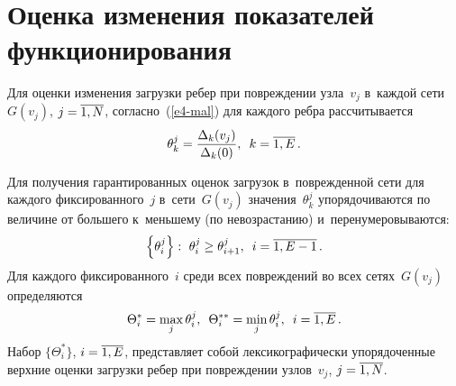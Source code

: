 \begin{multicols}{2}
\begin{figure*}[b] %
\vspace*{1pt}
  \begin{center}
 \mbox{%
 \epsfxsize=153.408mm 
 }
\end{center}
\vspace*{-9pt}
\end{figure*}


\section{Оценка изменения показателей функционирования }

Для оценки изменения загрузки ребер при по\-вреж\-де\-нии узла~$v_j$ в~каждой сети~$G(v_j)$, $j \hm= \overline{1, N}$, 
согласно~(\ref{e4-mal}) для каждого ребра рассчитывается
$$
\theta_k^j = \displaystyle\frac{\displaystyle \Delta_k(v_j)\mathstrut}{\displaystyle \Delta_k(0)\mathstrut}, \enskip k = \overline{1, E}\,.
$$

Для получения гарантированных оценок загрузок в~по\-вреж\-ден\-ной сети для каждого 
фиксированного~$j$ в~сети~$G(v_j)$ значения~$\theta_k^j$ упорядочиваются по 
величине от большего к~меньшему (по не\-воз\-рас\-та\-нию) и~перенумеровываются:
$$
\left\{\theta_i^j\right\}: \ \theta_{i}^j \ge \theta_{i+1}^j, \enskip  i = \overline{1, E-1}\,.
$$
Для каждого фиксированного~${i}$ среди всех  по\-вреж\-де\-ний во всех сетях~$G(v_j)$ 
определяются
$$
\Theta_i^* = \max_{j} \theta_i^j, \enskip \Theta_i^{**} = \min_{j} \theta_i^j,\enskip i = 
\overline{1, E}\,.
$$
Набор $\{\Theta_i^*\}$,  $i \hm= \overline{1, E}$, представляет собой лексикографически 
упорядоченные верхние оценки загрузки ребер при по\-вреж\-де\-нии узлов~$v_j$, $j \hm= \overline{1, N}$.

\begin{figure*} %
\vspace*{1pt}
  \begin{center}
 \mbox{%
 \epsfxsize=162.817mm 
 }
\end{center}
\vspace*{-10pt}
\end{figure*}

\begin{figure*}[b] %
\vspace*{6pt}
  \begin{center}
 \mbox{%
 \epsfxsize=162.783mm 
 }
\end{center}
\vspace*{-11pt}
\end{figure*}


\end{multicols}
